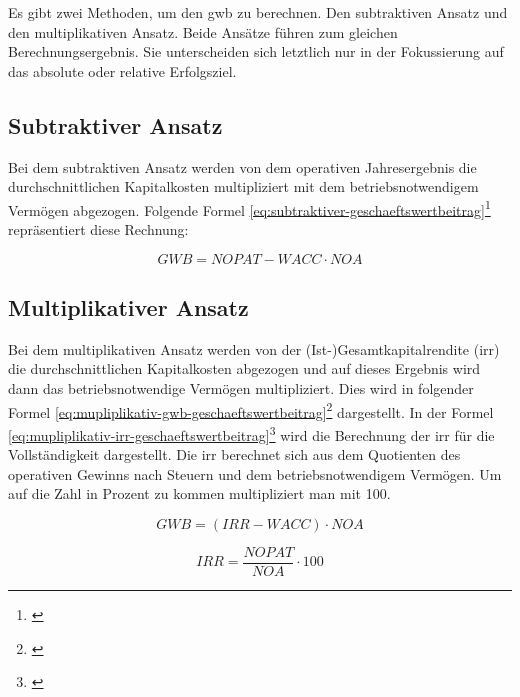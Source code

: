 \bigskip
\noindent
Es gibt zwei Methoden, um den \ac{gwb} zu berechnen. Den subtraktiven Ansatz und den multiplikativen Ansatz. Beide Ansätze führen zum gleichen Berechnungsergebnis. Sie unterscheiden sich letztlich nur in der Fokussierung auf das absolute oder relative Erfolgsziel.

\subsection{Subtraktiver Ansatz}

Bei dem subtraktiven Ansatz werden von dem operativen Jahresergebnis die durchschnittlichen Kapitalkosten multipliziert mit dem betriebsnotwendigem Vermögen abgezogen. Folgende Formel \eqref{eq:subtraktiver-geschaeftswertbeitrag}\footnote{\cite{wikipedia-eva}} repräsentiert diese Rechnung:

\begin{equation}
    GWB = NOPAT - WACC \cdot NOA
    \label{eq:subtraktiver-geschaeftswertbeitrag}
\end{equation}

\subsection{Multiplikativer Ansatz}

Bei dem multiplikativen Ansatz werden von der (Ist-)Gesamtkapitalrendite (\ac{irr}) die durchschnittlichen Kapitalkosten abgezogen und auf dieses Ergebnis wird dann das betriebsnotwendige Vermögen multipliziert. Dies wird in folgender Formel \eqref{eq:mupliplikativ-gwb-geschaeftswertbeitrag}\footnote{\cite{wikipedia-eva}} dargestellt. In der Formel \eqref{eq:mupliplikativ-irr-geschaeftswertbeitrag}\footnote{\cite{controllingportal-eva}} wird die Berechnung der \ac{irr} für die Vollständigkeit dargestellt. Die \ac{irr} berechnet sich aus dem Quotienten des operativen Gewinns nach Steuern und dem betriebsnotwendigem Vermögen. Um auf die Zahl in Prozent zu kommen multipliziert man mit 100.

\begin{equation}
    GWB = (IRR - WACC) \cdot NOA
    \label{eq:mupliplikativ-gwb-geschaeftswertbeitrag}
\end{equation}

\begin{equation}
    IRR = \frac{NOPAT}{NOA} \cdot 100
    \label{eq:mupliplikativ-irr-geschaeftswertbeitrag}
\end{equation}

\bigskip

